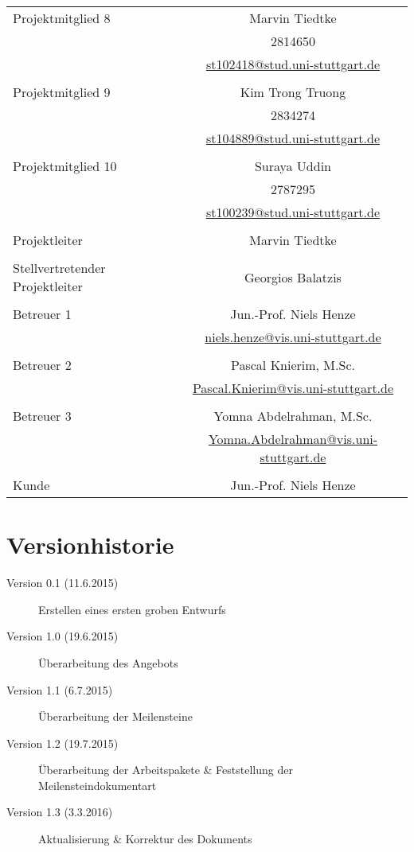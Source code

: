 \begin{center}
\begin{longtable}{ p{4cm}  p{4cm} c}
		\\
		Projektmitglied 8 & & Marvin Tiedtke \\
		& \matr & 2814650 \\
		& \email & \href{mailto:st102418@stud.uni-stuttgart.de}{st102418@stud.uni-stuttgart.de} \\
		\\
		Projektmitglied 9 & & Kim Trong Truong  \\
		& \matr & 2834274 \\
		& \email & \href{mailto:st104889@stud.uni-stuttgart.de}{st104889@stud.uni-stuttgart.de} \\
		\\
		Projektmitglied 10 & & Suraya Uddin \\
		& \matr & 2787295 \\
		& \email & \href{mailto:st100239@stud.uni-stuttgart.de}{st100239@stud.uni-stuttgart.de} \\
		\\
		Projektleiter & &  Marvin Tiedtke \\
		\\
		Stellvertretender Projektleiter & & Georgios Balatzis \\
		\\
		Betreuer 1 & & Jun.-Prof. Niels Henze \\
		& \email & \href{mailto:niels.henze@vis.uni-stuttgart.de}{niels.henze@vis.uni-stuttgart.de} \\
		\\
		Betreuer 2 & & Pascal Knierim, M.Sc. \\
		& \email & \href{mailto:Pascal.Knierim@vis.uni-stuttgart.de}{Pascal.Knierim@vis.uni-stuttgart.de} \\
		\\
		Betreuer 3 & & Yomna Abdelrahman, M.Sc. \\
		& \email & \href{mailto:Yomna.Abdelrahman@vis.uni-stuttgart.de}{Yomna.Abdelrahman@vis.uni-stuttgart.de} \\
		\\
		Kunde & & Jun.-Prof. Niels Henze
	\end{longtable}
\end{center}

\section{Versionhistorie}
\begin{description}
	\item [Version 0.1 (11.6.2015)] Erstellen eines ersten groben Entwurfs
	\item [Version 1.0 (19.6.2015)] Überarbeitung des Angebots
	\item [Version 1.1 (6.7.2015)] Überarbeitung der Meilensteine
	\item [Version 1.2 (19.7.2015)] Überarbeitung der Arbeitspakete \& Feststellung der Meilensteindokumentart
	\item [Version 1.3 (3.3.2016)] Aktualisierung \& Korrektur des Dokuments
\end{description}